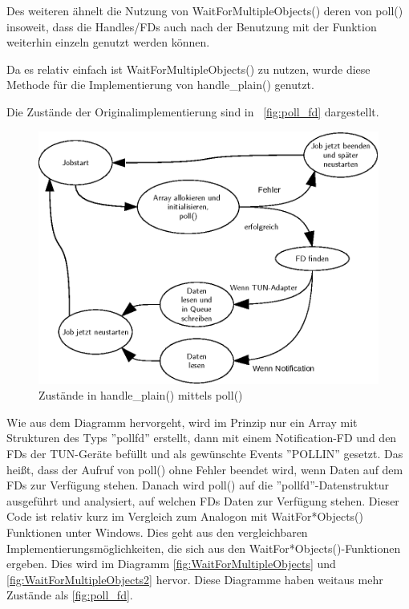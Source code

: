 Des weiteren ähnelt die Nutzung von WaitForMultipleObjects() deren von poll()
insoweit, dass die Handles/\acp{FD} auch nach der Benutzung mit der Funktion
weiterhin einzeln genutzt werden können.

Da es relativ einfach ist WaitForMultipleObjects() zu nutzen, wurde diese Methode
für die Implementierung von handle\_plain() genutzt.

Die Zustände der Originalimplementierung sind in ~\autoref{fig:poll_fd}
dargestellt.

\begin{figure}
\centering
\def\svgwidth{\columnwidth}
\includegraphics[width=\textwidth]{poll_fd.eps}
\caption{Zustände in handle\_plain() mittels poll()}
\label{fig:poll_fd}
\end{figure}


Wie aus dem Diagramm hervorgeht, wird im Prinzip nur ein Array mit Strukturen des Typs
''pollfd'' erstellt, dann mit einem Notification-\ac{FD} und den \acp{FD} der TUN-Geräte befüllt
und als gewünschte Events ''POLLIN'' gesetzt. Das heißt, dass der Aufruf von poll() ohne
Fehler beendet wird, wenn Daten auf dem \acp{FD} zur Verfügung stehen.
Danach wird poll() auf die ''pollfd''-Datenstruktur ausgeführt und analysiert,
auf welchen \acp{FD} Daten zur Verfügung stehen. Dieser Code ist relativ kurz im
Vergleich zum Analogon mit WaitFor*Objects() Funktionen unter Windows.
Dies geht aus den vergleichbaren Implementierungsmöglichkeiten, die sich aus den
WaitFor*Objects()-Funktionen ergeben. Dies wird im Diagramm \autoref{fig:WaitForMultipleObjects}
und \autoref{fig:WaitForMultipleObjects2} hervor. Diese Diagramme haben weitaus
mehr Zustände als \autoref{fig:poll_fd}.

